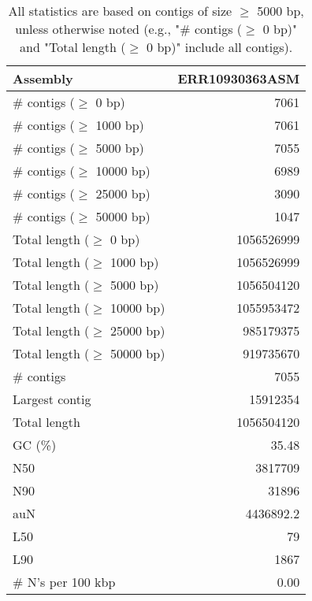 \documentclass[12pt,a4paper]{article}
\begin{document}
\begin{table}[ht]
\begin{center}
\caption{All statistics are based on contigs of size $\geq$ 5000 bp, unless otherwise noted (e.g., "\# contigs ($\geq$ 0 bp)" and "Total length ($\geq$ 0 bp)" include all contigs).}
\begin{tabular}{|l*{1}{|r}|}
\hline
Assembly & ERR10930363ASM \\ \hline
\# contigs ($\geq$ 0 bp) & 7061 \\ \hline
\# contigs ($\geq$ 1000 bp) & 7061 \\ \hline
\# contigs ($\geq$ 5000 bp) & 7055 \\ \hline
\# contigs ($\geq$ 10000 bp) & 6989 \\ \hline
\# contigs ($\geq$ 25000 bp) & 3090 \\ \hline
\# contigs ($\geq$ 50000 bp) & 1047 \\ \hline
Total length ($\geq$ 0 bp) & 1056526999 \\ \hline
Total length ($\geq$ 1000 bp) & 1056526999 \\ \hline
Total length ($\geq$ 5000 bp) & 1056504120 \\ \hline
Total length ($\geq$ 10000 bp) & 1055953472 \\ \hline
Total length ($\geq$ 25000 bp) & 985179375 \\ \hline
Total length ($\geq$ 50000 bp) & 919735670 \\ \hline
\# contigs & 7055 \\ \hline
Largest contig & 15912354 \\ \hline
Total length & 1056504120 \\ \hline
GC (\%) & 35.48 \\ \hline
N50 & 3817709 \\ \hline
N90 & 31896 \\ \hline
auN & 4436892.2 \\ \hline
L50 & 79 \\ \hline
L90 & 1867 \\ \hline
\# N's per 100 kbp & 0.00 \\ \hline
\end{tabular}
\end{center}
\end{table}
\end{document}
